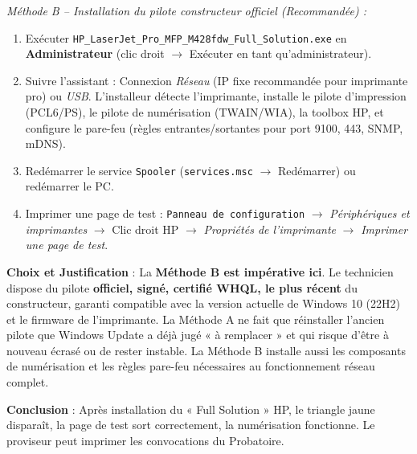 \documentclass[11pt]{article}
\begin{document}
\begin{exoresolu}
\emph{Méthode B -- Installation du pilote constructeur officiel (Recommandée) :}
\begin{enumerate}
\item Exécuter \texttt{HP\_LaserJet\_Pro\_MFP\_M428fdw\_Full\_Solution.exe} en \textbf{Administrateur} (clic droit $\rightarrow$ Exécuter en tant qu'administrateur).
\item Suivre l'assistant : Connexion \emph{Réseau} (IP fixe recommandée pour imprimante pro) ou \emph{USB}. L'installeur détecte l'imprimante, installe le pilote d'impression (PCL6/PS), le pilote de numérisation (TWAIN/WIA), la toolbox HP, et configure le pare-feu (règles entrantes/sortantes pour port 9100, 443, SNMP, mDNS).
\item Redémarrer le service \texttt{Spooler} (\texttt{services.msc} $\rightarrow$ Redémarrer) ou redémarrer le PC.
\item Imprimer une page de test : \texttt{Panneau de configuration} $\rightarrow$ \emph{Périphériques et imprimantes} $\rightarrow$ Clic droit HP $\rightarrow$ \emph{Propriétés de l'imprimante} $\rightarrow$ \emph{Imprimer une page de test}.
\end{enumerate}

\textbf{Choix et Justification} : La \textbf{Méthode B est impérative ici}. Le technicien dispose du pilote \textbf{officiel, signé, certifié WHQL, le plus récent} du constructeur, garanti compatible avec la version actuelle de Windows 10 (22H2) et le firmware de l'imprimante. La Méthode A ne fait que réinstaller l'ancien pilote que Windows Update a déjà jugé « à remplacer » et qui risque d'être à nouveau écrasé ou de rester instable. La Méthode B installe aussi les composants de numérisation et les règles pare-feu nécessaires au fonctionnement réseau complet.

\textbf{Conclusion} : Après installation du « Full Solution » HP, le triangle jaune disparaît, la page de test sort correctement, la numérisation fonctionne. Le proviseur peut imprimer les convocations du Probatoire.
\end{exoresolu}
\end{document}
